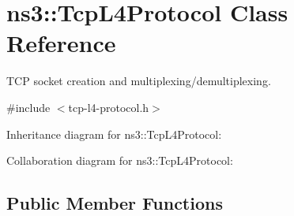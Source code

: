 \hypertarget{classns3_1_1TcpL4Protocol}{}\section{ns3\+:\+:Tcp\+L4\+Protocol Class Reference}
\label{classns3_1_1TcpL4Protocol}


T\+CP socket creation and multiplexing/demultiplexing.  




{\ttfamily \#include $<$tcp-\/l4-\/protocol.\+h$>$}



Inheritance diagram for ns3\+:\+:Tcp\+L4\+Protocol\+:


Collaboration diagram for ns3\+:\+:Tcp\+L4\+Protocol\+:
\subsection*{Public Member Functions}
